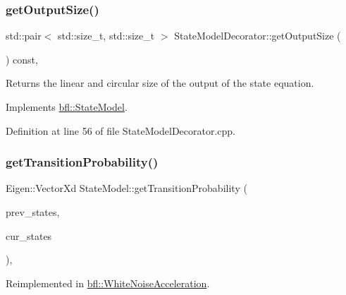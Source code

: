 \subsubsection{\texorpdfstring{get\+Output\+Size()}{getOutputSize()}}
{\footnotesize\ttfamily std\+::pair$<$ std\+::size\+\_\+t, std\+::size\+\_\+t $>$ State\+Model\+Decorator\+::get\+Output\+Size (\begin{DoxyParamCaption}{ }\end{DoxyParamCaption}) const\hspace{0.3cm}{\ttfamily [override]}, {\ttfamily [virtual]}}



Returns the linear and circular size of the output of the state equation. 



Implements \mbox{\hyperlink{classbfl_1_1StateModel_a6bf680b689389d959fc9ac46595e6dab}{bfl\+::\+State\+Model}}.



Definition at line 56 of file State\+Model\+Decorator.\+cpp.

\mbox{\label{classbfl_1_1StateModel_acb582cb7d41ec7b854ed1dbd8965b6fc}} 
\subsubsection{\texorpdfstring{get\+Transition\+Probability()}{getTransitionProbability()}}
{\footnotesize\ttfamily Eigen\+::\+Vector\+Xd State\+Model\+::get\+Transition\+Probability (\begin{DoxyParamCaption}\item[{const Eigen\+::\+Ref$<$ const Eigen\+::\+Matrix\+Xd $>$ \&}]{prev\+\_\+states,  }\item[{Eigen\+::\+Ref$<$ Eigen\+::\+Matrix\+Xd $>$}]{cur\+\_\+states }\end{DoxyParamCaption})\hspace{0.3cm}{\ttfamily [virtual]}, {\ttfamily [inherited]}}



Reimplemented in \mbox{\hyperlink{classbfl_1_1WhiteNoiseAcceleration_a10d81273e59d14f7d7ce794533c122a8}{bfl\+::\+White\+Noise\+Acceleration}}.



